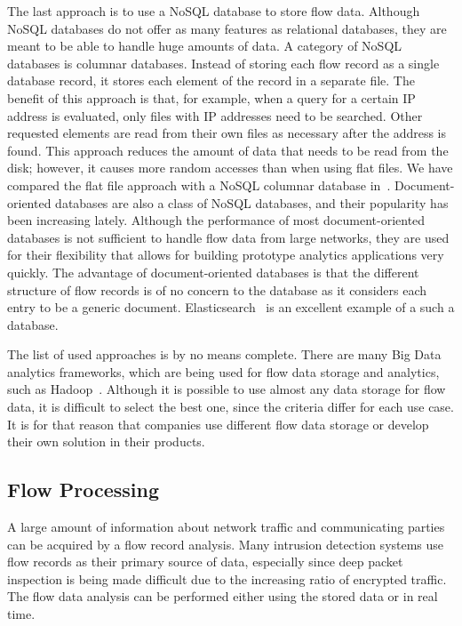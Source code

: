 The last approach is to use a NoSQL database to store flow data. Although NoSQL databases do not offer as many features as relational databases, they are meant to be able to handle huge amounts of data. A category of NoSQL databases is columnar databases. Instead of storing each flow record as a single database record, it stores each element of the record in a separate file. The benefit of this approach is that, for example, when a query for a certain IP address is evaluated, only files with IP addresses need to be searched. Other requested elements are read from their own files as necessary after the address is found. This approach reduces the amount of data that needs to be read from the disk; however, it causes more random accesses than when using flat files. We have compared the flat file approach with a NoSQL columnar database in~\cite{Velan-2013-Practical}. Document-oriented databases are also a class of NoSQL databases, and their popularity has been increasing lately. Although the performance of most document-oriented databases is not sufficient to handle flow data from large networks, they are used for their flexibility that allows for building prototype analytics applications very quickly. The advantage of document-oriented databases is that the different structure of flow records is of no concern to the database as it considers each entry to be a generic document. Elasticsearch~\cite{Gormley-2015-Elasticsearch} is an excellent example of a such a database.

The list of used approaches is by no means complete. There are many Big Data analytics frameworks, which are being used for flow data storage and analytics, such as Hadoop~\cite{Lee-2012-Toward}. Although it is possible to use almost any data storage for flow data, it is difficult to select the best one, since the criteria differ for each use case. It is for that reason that companies use different flow data storage or develop their own solution in their products.


\subsection{Flow Processing}\label{subsec:flow-processing}

A large amount of information about network traffic and communicating parties can be acquired by a flow record analysis. Many intrusion detection systems use flow records as their primary source of data, especially since deep packet inspection is being made difficult due to the increasing ratio of encrypted traffic. The flow data analysis can be performed either using the stored data or in real time.

